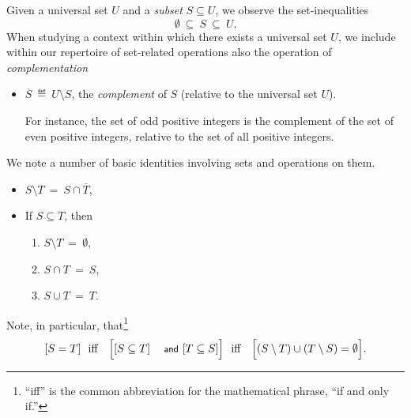 \bigskip

\noindent {}
\bigskip

\noindent
Given a universal set $U$ and a {\em subset} $S \subseteq U$,
we observe the set-inequalities
\[ \emptyset \ \subseteq \ S \ \subseteq \ U. \]
When studying a context within which there exists a universal set $U$,
we include within our repertoire of set-related operations also the
operation of {\it complementation}
\begin{itemize}
\item
$\overline{S} \ \eqdef \ U \setminus S$,
the {\em complement} of $S$ (relative to the universal set $U$).

For instance, the set of odd positive integers is the complement of
the set of even positive integers, relative to the set of all positive
integers.
\end{itemize}
We note a number of basic identities involving sets and operations on
them.
\begin{itemize}
\item
$S \setminus T \ = \ S \cap \overline{T}$,
\item
If $S \subseteq T$, then
  \begin{enumerate}
  \item
$S \setminus T \ = \ \emptyset$,
  \item
$S \cap T \ = \ S$,
  \item
$S \cup T \ = \ T$.
  \end{enumerate}
\end{itemize}
Note, in particular, that\footnote{``iff'' is the common abbreviation
  for the mathematical phrase, ``if and only if.''}
\[ [S = T] \ \mbox{  iff  } \ \ \Bigl[[S \subseteq T] \mbox{
    {\small\sf and} } [T \subseteq S]\Bigr] \ \mbox{  iff  }
\ \ \Bigl[ (S \setminus T) \cup (T \setminus S) = \emptyset\Bigr].
\]

